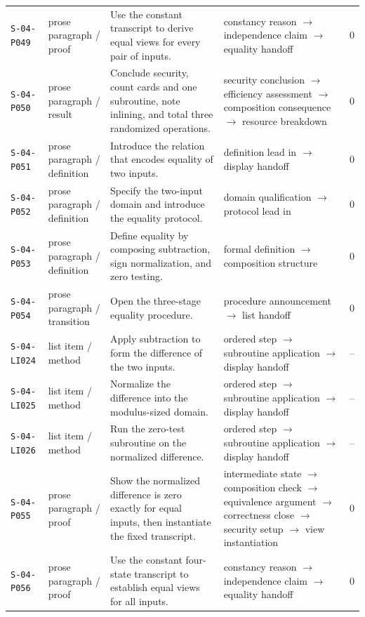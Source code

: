 \documentclass[10pt]{article}
\begin{document}
\begin{longtable}{@{}p{}p{}p{}p{}p{}@{}}
\texttt{S-04-P049}&prose paragraph / proof&Use the constant transcript to derive equal views for every pair of inputs.&constancy reason $\rightarrow$ independence claim $\rightarrow$ equality handoff&0\\
\texttt{S-04-P050}&prose paragraph / result&Conclude security, count cards and one subroutine, note inlining, and total three randomized operations.&security conclusion $\rightarrow$ efficiency assessment $\rightarrow$ composition consequence $\rightarrow$ resource breakdown&0\\
\texttt{S-04-P051}&prose paragraph / definition&Introduce the relation that encodes equality of two inputs.&definition lead in $\rightarrow$ display handoff&0\\
\texttt{S-04-P052}&prose paragraph / definition&Specify the two-input domain and introduce the equality protocol.&domain qualification $\rightarrow$ protocol lead in&0\\
\texttt{S-04-P053}&prose paragraph / definition&Define equality by composing subtraction, sign normalization, and zero testing.&formal definition $\rightarrow$ composition structure&0\\
\texttt{S-04-P054}&prose paragraph / transition&Open the three-stage equality procedure.&procedure announcement $\rightarrow$ list handoff&0\\
\texttt{S-04-LI024}&list item / method&Apply subtraction to form the difference of the two inputs.&ordered step $\rightarrow$ subroutine application $\rightarrow$ display handoff&--\\
\texttt{S-04-LI025}&list item / method&Normalize the difference into the modulus-sized domain.&ordered step $\rightarrow$ subroutine application $\rightarrow$ display handoff&--\\
\texttt{S-04-LI026}&list item / method&Run the zero-test subroutine on the normalized difference.&ordered step $\rightarrow$ subroutine application $\rightarrow$ display handoff&--\\
\texttt{S-04-P055}&prose paragraph / proof&Show the normalized difference is zero exactly for equal inputs, then instantiate the fixed transcript.&intermediate state $\rightarrow$ composition check $\rightarrow$ equivalence argument $\rightarrow$ correctness close $\rightarrow$ security setup $\rightarrow$ view instantiation&0\\
\texttt{S-04-P056}&prose paragraph / proof&Use the constant four-state transcript to establish equal views for all inputs.&constancy reason $\rightarrow$ independence claim $\rightarrow$ equality handoff&0\\

\end{longtable}
\end{document}
